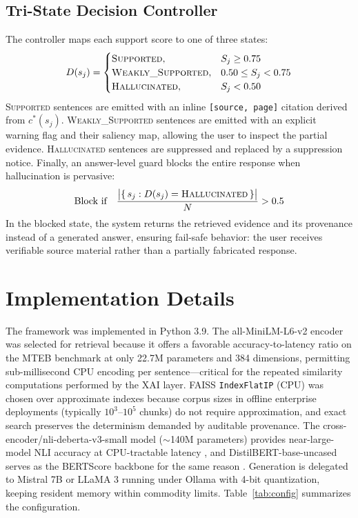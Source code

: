 \documentclass[journal]{IEEEtran}
\begin{document}
\subsection{Tri-State Decision Controller}
The controller maps each support score to one of three states:
\begin{equation}
D(s_j) =
\begin{cases}
\textsc{Supported}, & S_j \geq 0.75 \\
\textsc{Weakly\_Supported}, & 0.50 \leq S_j < 0.75 \\
\textsc{Hallucinated}, & S_j < 0.50
\end{cases}
\label{eq:tristate}
\end{equation}
\textsc{Supported} sentences are emitted with an inline
\texttt{[source, page]} citation derived from $c^{*}(s_j)$.
\textsc{Weakly\_Supported} sentences are emitted with an explicit warning
flag and their saliency map, allowing the user to inspect the partial
evidence. \textsc{Hallucinated} sentences are suppressed and replaced by a
suppression notice. Finally, an answer-level guard blocks the entire
response when hallucination is pervasive:
\begin{equation}
\text{Block if} \quad
\frac{\big|\{\, s_j : D(s_j) = \textsc{Hallucinated} \,\}\big|}{N} > 0.5
\label{eq:block}
\end{equation}
In the blocked state, the system returns the retrieved evidence and its
provenance instead of a generated answer, ensuring fail-safe behavior: the
user receives verifiable source material rather than a partially fabricated
response.

\section{Implementation Details}
The framework was implemented in Python 3.9. The all-MiniLM-L6-v2 encoder
was selected for retrieval because it offers a favorable accuracy-to-latency
ratio on the MTEB benchmark \cite{muennighoff2022mteb} at only 22.7M
parameters and 384 dimensions, permitting sub-millisecond CPU encoding per
sentence---critical for the repeated similarity computations performed by
the XAI layer. FAISS \texttt{IndexFlatIP} (CPU) \cite{johnson2019faiss} was
chosen over approximate indexes because corpus sizes in offline enterprise
deployments (typically $10^3$--$10^5$ chunks) do not require approximation,
and exact search preserves the determinism demanded by auditable provenance.
The cross-encoder/nli-deberta-v3-small model ($\sim$140M parameters)
provides near-large-model NLI accuracy at CPU-tractable latency
\cite{he2023debertav3}, and DistilBERT-base-uncased serves as the BERTScore
backbone for the same reason \cite{sanh2019distilbert}. Generation is
delegated to Mistral 7B \cite{jiang2023mistral} or LLaMA 3
\cite{touvron2023llama} running under Ollama with 4-bit quantization,
keeping resident memory within commodity limits. Table~\ref{tab:config}
summarizes the configuration.
\end{document}

